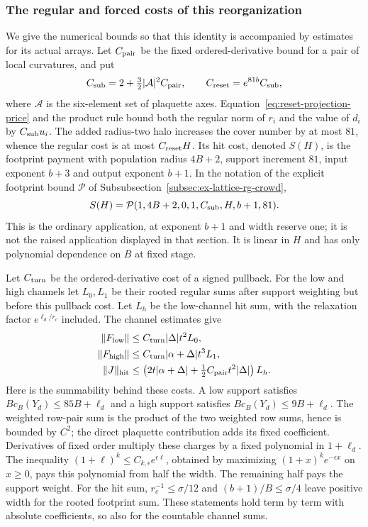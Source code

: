 \subsubsection{The regular and forced costs of this reorganization}
We give the numerical bounds so that this identity is accompanied
by estimates for its actual arrays. Let $C_{\rm pair}$ be the
fixed ordered-derivative bound for a pair of local curvatures, and put
\[
 C_{\rm sub}=2+\tfrac32|\mathcal A|^2C_{\rm pair},
                  \qquad C_{\rm reset}=e^{81b}C_{\rm sub},
\]
where $\mathcal A$ is the six-element set of plaquette axes.
Equation~\eqref{eq:reset-projection-price} and the product rule bound
both the regular norm of $r_i$ and the value of $d_i$ by
$C_{\rm sub}u_i$. The added radius-two halo increases the cover number
by at most $81$, whence the regular cost is at most
$C_{\rm reset}H$. Its hit cost, denoted $S(H)$, is the footprint
payment with population radius $4B+2$, support increment $81$,
input exponent $b+3$ and output exponent $b+1$. In the notation of
the explicit footprint bound $\mathcal P$ of
Subsubsection~\ref{subsec:ex-lattice-rg-crowd},
\[
 S(H)=\mathcal P(1,4B+2,0,1,C_{\rm sub},H,b+1,81).
\]
This is the ordinary application, at exponent $b+1$ and width
reserve one; it is not the raised application displayed in that
section. It is linear
in $H$ and has only polynomial dependence on $B$ at fixed stage.

Let $C_{\rm turn}$ be the ordered-derivative cost of a signed
pullback. For the low and high channels let $L_0,L_1$ be their rooted
regular sums after support weighting but before this pullback cost.
Let $L_h$ be the low-channel hit sum, with the relaxation factor
$e^{\ell_d/r_c}$ included. The channel estimates give
\begin{align}
 \|F_{\rm low}\|&\le C_{\rm turn}|\Delta|t^2L_0,\nonumber\\
 \|F_{\rm high}\|&\le C_{\rm turn}|\alpha+\Delta|t^3L_1,
                                                    \label{eq:reset-channel-costs}\\
 \|J\|_{\rm hit}&\le
 \left(2t|\alpha+\Delta|+\tfrac12C_{\rm pair}t^2|\Delta|\right)L_h.
                                                        \nonumber
\end{align}
Here is the summability behind these costs. A low support satisfies
$Bc_B(Y_d)\le85B+\ell_d$ and a high support satisfies
$Bc_B(Y_d)\le9B+\ell_d$. The weighted row-pair sum is the product
of the two weighted row sums, hence is bounded by $C^2$; the direct
plaquette contribution adds its fixed coefficient. Derivatives of
fixed order multiply these charges by a fixed polynomial in
$1+\ell_d$. The inequality
$(1+\ell)^k\le C_{k,\epsilon}e^{\epsilon\ell}$, obtained by
maximizing $(1+x)^ke^{-\epsilon x}$ on $x\ge0$, pays this polynomial
from half the width. The remaining half pays the support weight.
For the hit sum, $r_c^{-1}\le\sigma/12$ and
$(b+1)/B\le\sigma/4$ leave positive width for the rooted footprint
sum. These statements hold term by term with absolute coefficients,
so also for the countable channel sums.

